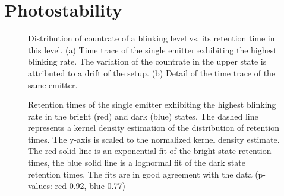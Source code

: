 



	\section{Photostability} \label{subsec::photostab}


	\begin{figure}[tp]
		\begin{subfigure}[tp]{ 0.49\linewidth}
			\caption{}\label{subfig::blink_long}
			\centering
		\end{subfigure}
		\hfill
		\begin{subfigure}[tp]{ 0.49\linewidth}
			\caption{}\label{subfig::blink_short}
			\centering
		\end{subfigure}
		\caption{Distribution of countrate of a blinking level vs. its retention time in this level. (a) Time trace of the single emitter exhibiting the highest blinking rate. The variation of the countrate in the upper state is attributed to a drift of the setup. (b) Detail of the time trace of the same emitter.}
		\label{fig::blink}
	\end{figure}

	\begin{figure}[tp]
		\centering
		\caption{Retention times of the single emitter exhibiting the highest blinking rate in the bright (red) and dark (blue) states. The dashed line represents a kernel density estimation of the distribution of retention times. The y-axis is scaled to the normalized kernel density estimate. The red solid line is an exponential fit of the bright state retention times, the blue solid line is a lognormal fit of the dark state retention times. The fits are in good agreement with the data (p-values: red 0.92, blue 0.77)}
		\label{fig::fit_blink_distr}
	\end{figure}

